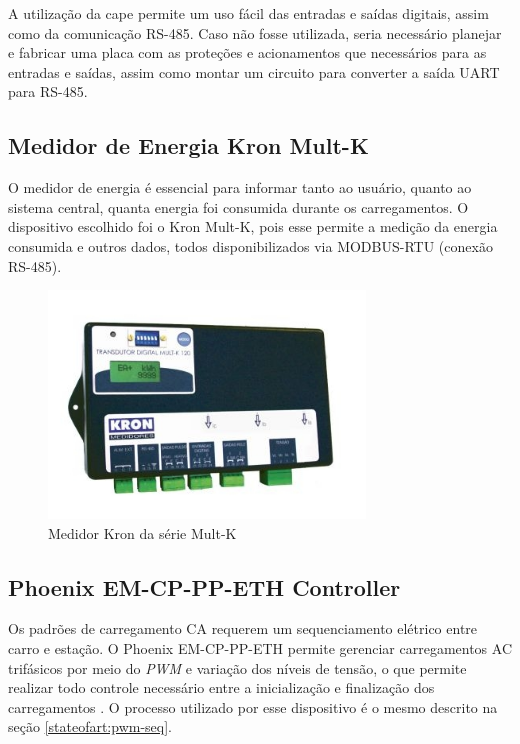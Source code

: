       A utilização da cape permite um uso fácil das entradas e saídas digitais, assim como da comunicação RS-485. Caso não fosse utilizada, seria necessário planejar e fabricar uma placa com as proteções e acionamentos que necessários para as entradas e saídas, assim como montar um circuito para converter a saída \ac{UART} para RS-485. 

    \subsection{Medidor de Energia Kron Mult-K}
    \label{methodology:devices:kron}

      O medidor de energia é essencial para informar tanto ao usuário, quanto ao sistema central, quanta energia foi consumida durante os carregamentos. O dispositivo escolhido foi o Kron Mult-K, pois esse permite a medição da energia consumida e outros dados, todos disponibilizados via MODBUS-RTU (conexão RS-485).

      \begin{figure}[H]
        \begin{center}
          \includegraphics[width=0.75\textwidth,natwidth=400,natheight=288]{assets/images/devices-kron.jpg}
          \caption{Medidor Kron da série Mult-K}
          \label{fig:kron}
        \end{center}
      \end{figure}

    \subsection{Phoenix EM-CP-PP-ETH Controller}
    \label{methodology:devices:phoenix}

      Os padrões de carregamento \ac{CA} requerem um sequenciamento elétrico entre carro e estação. O Phoenix EM-CP-PP-ETH permite gerenciar carregamentos AC trifásicos por meio do \textit{\ac{PWM}} e variação dos níveis de tensão, o que permite realizar todo controle necessário entre a inicialização e finalização dos carregamentos \cite{phoenix}. O processo utilizado por esse dispositivo é o mesmo descrito na seção \ref{stateofart:pwm-seq}.

